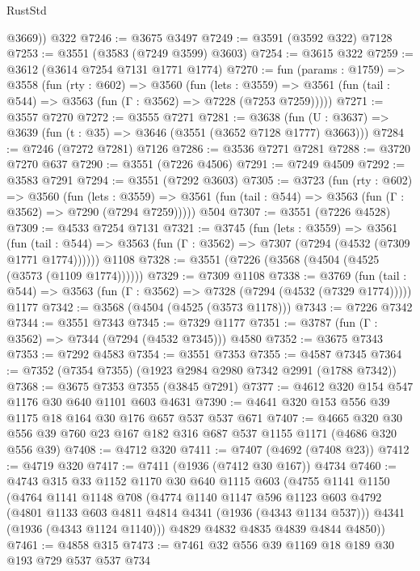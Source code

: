 \begin{lexlean}{RustStd}
\begin{coremodule}
        @3669))
    @322
@7246 := @3675 @3497
@7249 := @3591 (@3592 @322) @7128
@7253 := @3551 (@3583 (@7249 @3599) @3603)
@7254 := @3615 @322
@7259 := @3612 (@3614 @7254 @7131 @1771 @1774)
@7270 := fun (params : @1759) =>
  @3558
    (fun (rty : @602) =>
    @3560
      (fun (lets : @3559) =>
      @3561 (fun (tail : @544) => @3563 (fun (Γ : @3562) => @7228 (@7253 @7259)))))
@7271 := @3557 @7270
@7272 := @3555 @7271
@7281 := @3638 (fun (U : @3637) => @3639 (fun (t : @35) => @3646 (@3551 (@3652 @7128 @1777) @3663)))
@7284 := @7246 (@7272 @7281) @7126
@7286 := @3536 @7271 @7281
@7288 := @3720 @7270 @637
@7290 := @3551 (@7226 @4506)
@7291 := @7249 @4509
@7292 := @3583 @7291
@7294 := @3551 (@7292 @3603)
@7305 := @3723
    (fun (rty : @602) =>
    @3560
      (fun (lets : @3559) =>
      @3561 (fun (tail : @544) => @3563 (fun (Γ : @3562) => @7290 (@7294 @7259)))))
    @504
@7307 := @3551 (@7226 @4528)
@7309 := @4533 @7254 @7131
@7321 := @3745
    (fun (lets : @3559) =>
    @3561
      (fun (tail : @544) => @3563 (fun (Γ : @3562) => @7307 (@7294 (@4532 (@7309 @1771 @1774))))))
    @1108
@7328 := @3551 (@7226 (@3568 (@4504 (@4525 (@3573 (@1109 @1774))))))
@7329 := @7309 @1108
@7338 := @3769
    (fun (tail : @544) => @3563 (fun (Γ : @3562) => @7328 (@7294 (@4532 (@7329 @1774)))))
    @1177
@7342 := @3568 (@4504 (@4525 (@3573 @1178)))
@7343 := @7226 @7342
@7344 := @3551 @7343
@7345 := @7329 @1177
@7351 := @3787 (fun (Γ : @3562) => @7344 (@7294 (@4532 @7345))) @4580
@7352 := @3675 @7343
@7353 := @7292 @4583
@7354 := @3551 @7353
@7355 := @4587 @7345
@7364 := @7352 (@7354 @7355) (@1923 @2984 @2980 @7342 @2991 (@1788 @7342))
@7368 := @3675 @7353 @7355 (@3845 @7291)
@7377 := @4612 @320 @154 @547 @1176 @30 @640 @1101 @603 @4631
@7390 := @4641 @320 @153 @556 @39 @1175 @18 @164 @30 @176 @657 @537 @537 @671
@7407 := @4665 @320 @30 @556 @39 @760 @23 @167 @182 @316 @687 @537 @1155 @1171 (@4686 @320 @556 @39)
@7408 := @4712 @320
@7411 := @7407 (@4692 (@7408 @23))
@7412 := @4719 @320
@7417 := @7411 (@1936 (@7412 @30 @167)) @4734
@7460 := @4743
    @315
    @33
    @1152
    @1170
    @30
    @640
    @1115
    @603
    (@4755
      @1141
      @1150
      (@4764
        @1141
        @1148
        @708
        (@4774
          @1140
          @1147
          @596
          @1123
          @603
          @4792
          (@4801 @1133 @603 @4811 @4814 @4341 (@1936 (@4343 @1134 @537)))
          @4341
          (@1936 (@4343 @1124 @1140)))
        @4829
        @4832
        @4835
        @4839
        @4844
        @4850))
@7461 := @4858 @315
@7473 := @7461 @32 @556 @39 @1169 @18 @189 @30 @193 @729 @537 @537 @734

\end{coremodule}
\end{lexlean}
